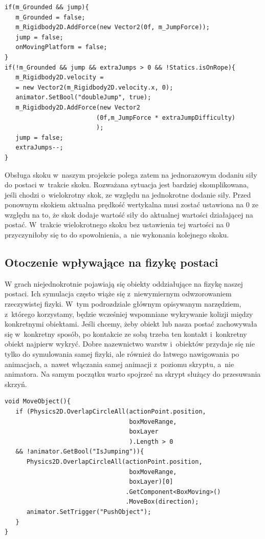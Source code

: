 \documentclass[oneside,polski,logo]{amuthesis}
\begin{document}
\begin{lstlisting}[breaklines=true,
language={[Sharp]C},
rulecolor=\color{blue!80!black},
caption={Fragment klasy \texttt{CharacterController.cs}}
]
if(m_Grounded && jump){
   m_Grounded = false;
   m_Rigidbody2D.AddForce(new Vector2(0f, m_JumpForce));
   jump = false;
   onMovingPlatform = false;
}
if(!m_Grounded && jump && extraJumps > 0 && !Statics.isOnRope){
   m_Rigidbody2D.velocity =
   = new Vector2(m_Rigidbody2D.velocity.x, 0);
   animator.SetBool("doubleJump", true);
   m_Rigidbody2D.AddForce(new Vector2
                         (0f,m_JumpForce * extraJumpDifficulty)
                         );
   jump = false;
   extraJumps--;
}
\end{lstlisting}
\newpage
Obsługa skoku w~naszym projekcie polega zatem na jednorazowym dodaniu siły do postaci w~trakcie skoku. Rozważana sytuacja jest bardziej skomplikowana, jeśli chodzi o~wielokrotny skok, ze względu na jednokrotne dodanie siły. Przed ponownym skokiem aktualna prędkość wertykalna musi zostać ustawiona na 0 ze względu na to, że skok dodaje wartość siły do aktualnej wartości działającej na postać. W~trakcie wielokrotnego skoku bez ustawienia tej wartości na 0 przyczyniłoby się to do spowolnienia, a~nie wykonania kolejnego skoku.

\subsection{Otoczenie wpływające na fizykę postaci}
W grach niejednokrotnie pojawiają się obiekty oddziałujące na fizykę naszej postaci. Ich symulacja często wiąże się z~niewymiernym odwzorowaniem rzeczywistej fizyki. W~tym podrozdziale głównym opisywanym narzędziem, z~którego korzystamy, będzie wcześniej wspomniane wykrywanie kolizji między konkretnymi obiektami. Jeśli chcemy, żeby obiekt lub nasza postać zachowywała się w~konkretny sposób, po kontakcie ze sobą trzeba ten kontakt i~konkretny obiekt najpierw wykryć. Dobre nazewnictwo warstw i~obiektów przydaje się nie tylko do symulowania samej fizyki, ale również do łatwego nawigowania po animacjach, a~nawet włączania samej animacji z~poziomu skryptu, a~nie animatora. Na samym początku warto spojrzeć na skrypt służący do przesuwania skrzyń.


\begin{lstlisting}[breaklines=true,
language={[Sharp]C},
rulecolor=\color{blue!80!black},
caption={Fragment klasy \texttt{PlayerMovement.cs}}
]
void MoveObject(){
   if (Physics2D.OverlapCircleAll(actionPoint.position, 
                                  boxMoveRange, 
                                  boxLayer
                                  ).Length > 0 
   && !animator.GetBool("IsJumping")){
      Physics2D.OverlapCircleAll(actionPoint.position,
                                  boxMoveRange,
                                  boxLayer)[0]
                                 .GetComponent<BoxMoving>()
                                 .MoveBox(direction);
      animator.SetTrigger("PushObject");
   }
}
\end{lstlisting}
\end{document}
